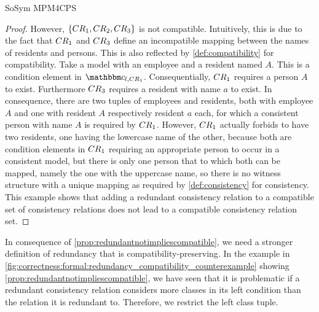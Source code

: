 \begin{copiedFrom}{SoSym MPM4CPS}
\begin{proof}
However, $\{ CR_{1}, CR_{2}, CR_{3} \}$ is not compatible.
Intuitively, this is due to the fact that $CR_{1}$ and $CR_{3}$ define an incompatible mapping between the names of residents and persons.
This is also reflected by \autoref{def:compatibility} for compatibility. Take a model with an employee and a resident named $A$. This is a condition element in $\condition{c}{l,\consistencyrelation{CR}{1}}$. 
Consequentially, $CR_{1}$ requires a person $A$ to exist. Furthermore $CR_{3}$ requires a resident with name $a$ to exist.
In consequence, there are two tuples of employees and residents, both with employee $A$ and one with resident $A$ respectively resident $a$ each, for which a consistent person with name $A$ is required by $CR_{1}$.
However, $CR_{1}$ actually forbids to have two residents, one having the lowercase name of the other, because both are condition elements in $CR_{1}$ requiring an appropriate person to occur in a consistent model, but there is only one person that to which both can be mapped, namely the one with the uppercase name, so there is no witness structure with a unique mapping as required by \autoref{def:consistency} for consistency.
This example shows that adding a redundant consistency relation to a compatible set of consistency relations does not lead to a compatible consistency relation set.
\end{proof}

In consequence of \autoref{prop:redundantnotimpliescompatible}, we need a stronger definition of redundancy that is compatibility-preserving. 
In the example in \autoref{fig:correctness:formal:redundancy_compatibility_counterexample} showing \autoref{prop:redundantnotimpliescompatible}, we have seen that it is problematic if a redundant consistency relation considers more classes in its left condition than the relation it is redundant to.
Therefore, we restrict the left class tuple.


\end{copiedFrom}
